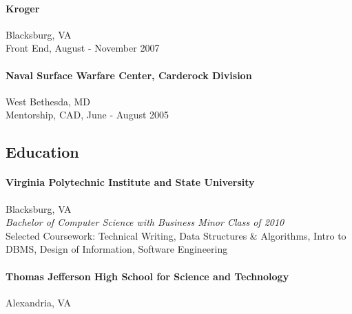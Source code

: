 \documentclass[10pt]{article}
\begin{document}
{
\paragraph*{Kroger}
Blacksburg, VA\\
Front End, August - November 2007
}{}

{
\paragraph*{Naval Surface Warfare Center, Carderock Division}
West Bethesda, MD\\
Mentorship, CAD, June - August 2005
}{}


\subsection*{Education}
\paragraph*{Virginia Polytechnic Institute and State University}\quad Blacksburg, VA\\
\textit{Bachelor of Computer Science with Business Minor \quad Class of 2010}\\
Selected Coursework: Technical Writing, Data Structures \& Algorithms, Intro to DBMS, Design of Information, Software Engineering
\paragraph*{Thomas Jefferson High School for Science and Technology}\quad Alexandria, VA
\end{document}
